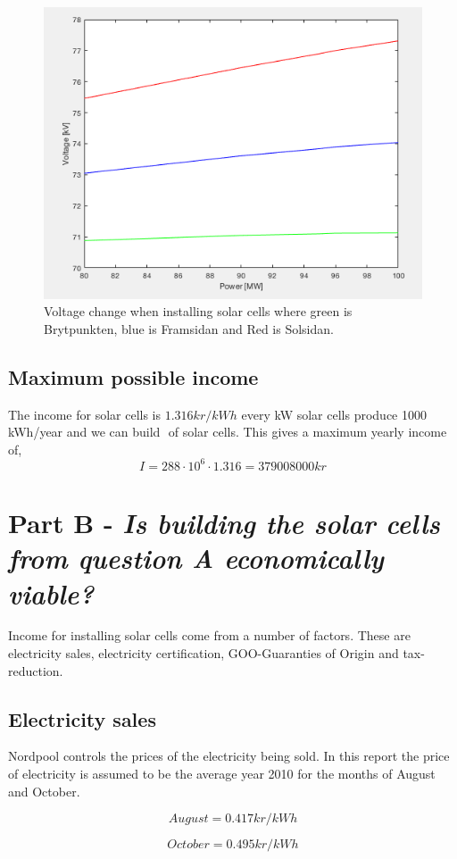 \documentclass{report}
\newcommand{\mypart}[2]{\section*{Part #1 - \textit{#2}}}
\newcommand{\mysubpart}[1]{\subsection*{#1}}
\begin{document}
\begin{figure}[h]
\label{voltagechange}
\includegraphics[width=\linewidth]{voltagechange.png}
\caption{Voltage change when installing solar cells where green is Brytpunkten, blue is Framsidan and Red is Solsidan.} 
\end{figure}

 
\mysubpart{ Maximum possible income}
The income for solar cells is $ 1.316 kr/kWh $ every kW solar cells produce 1000 kWh/year and we can build $  $ of solar cells. This gives a maximum yearly income of, 
\begin{equation}
I = 288 \cdot 10^6 \cdot 1.316 = 379008000 kr
\end{equation}

\newpage 
\mypart{B}{Is building the solar cells from question A economically viable?}

Income for installing solar cells come from a number of factors. These are electricity sales, electricity certification,  GOO-Guaranties of Origin and tax-reduction.

\mysubpart{Electricity sales}
Nordpool controls the prices of the electricity being sold. In this report the price of electricity is assumed to be the average year 2010 for the months of August and October. 

\begin{equation}
August = 0.417 kr/kWh
\end{equation}

\begin{equation}
October = 0.495 kr/kWh
\end{equation}
\end{document}
